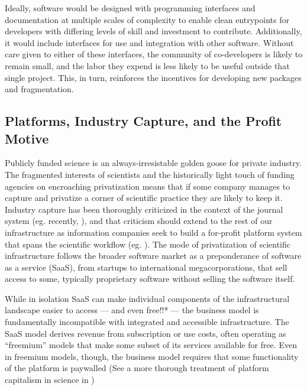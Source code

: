 \documentclass[notoc]{tufte-book}
\begin{document}
Ideally, software would be designed with programming interfaces and
documentation at multiple scales of complexity to enable clean
entrypoints for developers with differing levels of skill and investment
to contribute. Additionally, it would include interfaces for use and
integration with other software. Without care given to either of these
interfaces, the community of co-developers is likely to remain small,
and the labor they expend is less likely to be useful outside that
single project. This, in turn, reinforces the incentives for developing
new packages and fragmentation.


\subsection{Platforms, Industry Capture, and the Profit
Motive}

Publicly funded science is an always-irresistable golden goose for
private industry. The fragmented interests of scientists and the
historically light touch of funding agencies on encroaching
privatization means that if some company manages to capture and
privatize a corner of scientific practice they are likely to keep it.
Industry capture has been thoroughly criticized in the context of the
journal system (eg. recently, \citep{brembsReplacingAcademicJournals2021} ), and that criticism should
extend to the rest of our infrastructure as information companies seek
to build a for-profit platform system that spans the scientific workflow
(eg. \citep{ElsevierSevenBridges2017} ). The mode of privatization
of scientific infrastructure follows the broader software market as a
preponderance of software as a service (SaaS), from startups to
international megacorporations, that sell access to some, typically
proprietary software without selling the software itself.

While in isolation SaaS can make individual components of the
infrastructural landscape easier to access --- and even free!!* --- the
business model is fundamentally incompatible with integrated and
accessible infrastructure. The SaaS model derives revenue from
subscription or use costs, often operating as ``freemium'' models that
make some subset of its services available for free. Even in freemium
models, though, the business model requires that some functionality of
the platform is paywalled (See a more thorough treatment of platform
capitalism in science in \citep{mirowskiFutureOpenScience2018} )
\end{document}
